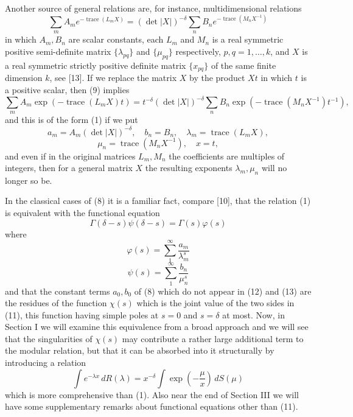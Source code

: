 \documentclass[12pt]{article}
\begin{document}
Another source of general relations are, for instance, multidimensional relations
\begin{equation}
\sum_m A_m e^{-\operatorname{trace}(L_m X)} = (\det |X|)^{-\delta} \sum_n B_n e^{-\operatorname{trace}(M_n X^{-1})}
\tag{9}
\end{equation}
in which \(A_m, B_n\) are scalar constants, each \(L_m\) and \(M_n\) is a real symmetric positive semi-definite matrix \(\{\lambda_{pq}\}\) and \(\{\mu_{pq}\}\) respectively, \(p, q = 1, \dots, k\), and \(X\) is a real symmetric strictly positive definite matrix \(\{x_{pq}\}\) of the same finite dimension \(k\), see [13]. If we replace the matrix \(X\) by the product \(Xt\) in which \(t\) is a positive scalar, then (9) implies
\begin{equation}
\sum_m A_m \exp(-\operatorname{trace}(L_m X)t) = t^{-\delta} (\det |X|)^{-\delta} \sum_n B_n \exp(-\operatorname{trace}(M_n X^{-1})t^{-1}),
\tag{10}
\end{equation}
and this is of the form (1) if we put
\[
a_m = A_m (\det |X|)^{-\delta}, \quad b_n = B_n, \quad \lambda_m = \operatorname{trace}(L_m X),
\]
\[
\mu_n = \operatorname{trace}(M_n X^{-1}), \quad x = t,
\]
and even if in the original matrices \(L_m, M_n\) the coefficients are multiples of integers, then for a general matrix \(X\) the resulting exponents \(\lambda_m, \mu_n\) will no longer so be.

In the classical cases of (8) it is a familiar fact, compare [10], that the relation (1) is equivalent with the functional equation
\begin{equation}
\Gamma(\delta - s) \psi(\delta - s) = \Gamma(s) \varphi(s)
\tag{11}
\end{equation}
where
\begin{equation}
\varphi(s) = \sum_1^{\infty} \frac{a_m}{\lambda_m^s}
\tag{12}
\end{equation}
\begin{equation}
\psi(s) = \sum_1^{\infty} \frac{b_n}{\mu_n^s}
\tag{13}
\end{equation}
and that the constant terms \(a_0, b_0\) of (8) which do not appear in (12) and (13) are the residues of the function \(\chi(s)\) which is the joint value of the two sides in (11), this function having simple poles at \(s = 0\) and \(s = \delta\) at most. Now, in Section I we will examine this equivalence from a broad approach and we will see that the singularities of \(\chi(s)\) may contribute a rather large additional term to the modular relation, but that it can be absorbed into it structurally by introducing a relation
\begin{equation}
\int e^{-\lambda x} \, dR(\lambda) = x^{-\delta} \int \exp \left( -\frac{\mu}{x} \right) \, dS(\mu)
\tag{14}
\end{equation}
which is more comprehensive than (1). Also near the end of Section III we will have some supplementary remarks about functional equations other than (11).
\end{document}

